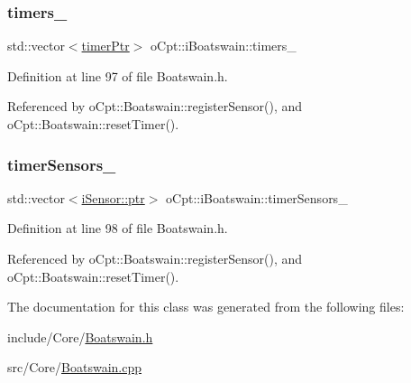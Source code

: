 \subsubsection{\texorpdfstring{timers\+\_\+}{timers\_}}
{\footnotesize\ttfamily std\+::vector$<$\hyperlink{classo_cpt_1_1i_boatswain_ac42d91dd3964880be9475ccaab4231cd}{timer\+Ptr}$>$ o\+Cpt\+::i\+Boatswain\+::timers\+\_\+\hspace{0.3cm}{\ttfamily [protected]}}



Definition at line 97 of file Boatswain.\+h.



Referenced by o\+Cpt\+::\+Boatswain\+::register\+Sensor(), and o\+Cpt\+::\+Boatswain\+::reset\+Timer().

\hypertarget{classo_cpt_1_1i_boatswain_ac25402266e3daa376e407a9f5ba73130}{}\label{classo_cpt_1_1i_boatswain_ac25402266e3daa376e407a9f5ba73130} 
\subsubsection{\texorpdfstring{timer\+Sensors\+\_\+}{timerSensors\_}}
{\footnotesize\ttfamily std\+::vector$<$\hyperlink{classo_cpt_1_1i_sensor_a03533d2c5dc66e332d70dbb3b5e3006a}{i\+Sensor\+::ptr}$>$ o\+Cpt\+::i\+Boatswain\+::timer\+Sensors\+\_\+\hspace{0.3cm}{\ttfamily [protected]}}



Definition at line 98 of file Boatswain.\+h.



Referenced by o\+Cpt\+::\+Boatswain\+::register\+Sensor(), and o\+Cpt\+::\+Boatswain\+::reset\+Timer().



The documentation for this class was generated from the following files\+:\begin{DoxyCompactItemize}
\item 
include/\+Core/\hyperlink{_boatswain_8h}{Boatswain.\+h}\item 
src/\+Core/\hyperlink{_boatswain_8cpp}{Boatswain.\+cpp}\end{DoxyCompactItemize}
